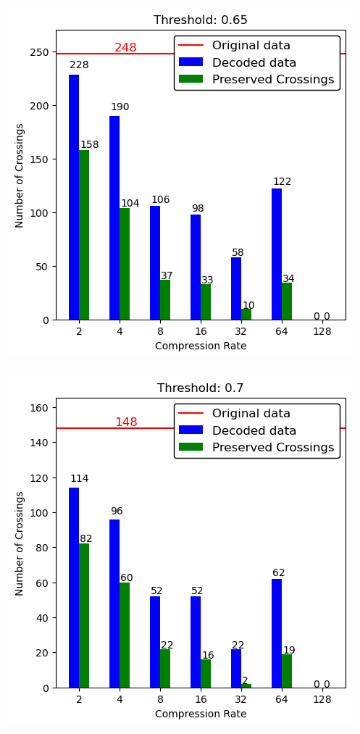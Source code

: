\begin{appendices}
\begin{figure}
\begin{subfigure}{.5\textwidth}
	\end{subfigure}
\end{figure}
\begin{figure}
	\ContinuedFloat
	\begin{subfigure}{.5\textwidth}
		\includegraphics[width=\textwidth]{../../Images/spikes_threshold_065.png}
	\end{subfigure}
	\begin{subfigure}{.5\textwidth}
		\includegraphics[width=\textwidth]{../../Images/spikes_threshold_07.png}

\end{subfigure}
\end{figure}
\end{appendices}
